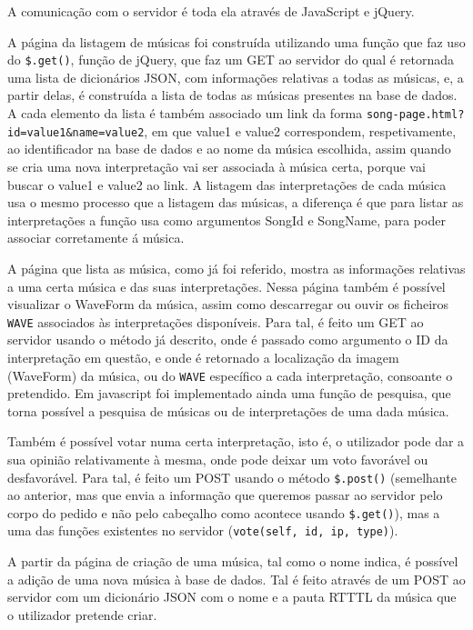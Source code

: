 \documentclass[a4paper,11pt,openright,oneside]{report}
\begin{document}
A comunicação com o servidor é toda ela através de JavaScript e jQuery.

A página da listagem de músicas foi construída utilizando uma função que faz uso do \texttt{\$.get()}, função de jQuery, que faz um GET ao servidor do qual é retornada uma lista de dicionários JSON, com informações relativas a todas as músicas, e, a partir delas, é construída a lista de todas as músicas presentes na base de dados. A cada elemento da lista é também associado um link da forma \texttt{song-page.html?id=value1\&name=value2}, em que value1 e value2 correspondem, respetivamente, ao identificador na base de dados e ao nome da música escolhida, assim quando se cria uma nova interpretação vai ser associada à música certa, porque vai buscar o value1 e value2 ao link. A listagem das interpretações de cada música usa o mesmo processo que a listagem das músicas, a diferença é que para listar as interpretações a função usa como argumentos SongId e SongName, para poder associar corretamente á música.

A página que lista as música, como já foi referido, mostra as informações relativas a uma certa música e das suas interpretações. Nessa página também é possível visualizar o WaveForm da música, assim como descarregar ou ouvir os ficheiros \verb|WAVE| associados às interpretações disponíveis. Para tal, é feito um GET ao servidor usando o método já descrito, onde é passado como argumento o ID da interpretação em questão, e onde é retornado a localização da imagem (WaveForm) da música, ou do \verb|WAVE| específico a cada interpretação, consoante o pretendido. Em javascript foi implementado ainda uma função de pesquisa, que torna possível a pesquisa de músicas ou de interpretações de uma dada música.

Também é possível votar numa certa interpretação, isto é, o utilizador pode dar a sua opinião relativamente à mesma, onde pode deixar um voto favorável ou desfavorável. Para tal, é feito um POST usando o método \texttt{\$.post()} (semelhante ao anterior, mas que envia a informação que queremos passar ao servidor pelo corpo do pedido e não pelo cabeçalho como acontece usando \texttt{\$.get()}), mas a uma das funções existentes no servidor (\texttt{vote(self, id, ip, type)}).

A partir da página de criação de uma música, tal como o nome indica, é possível a adição de uma nova música à base de dados. Tal é feito através de um POST ao servidor com um dicionário JSON com o nome e a pauta RTTTL da música que o utilizador pretende criar.
\end{document}

